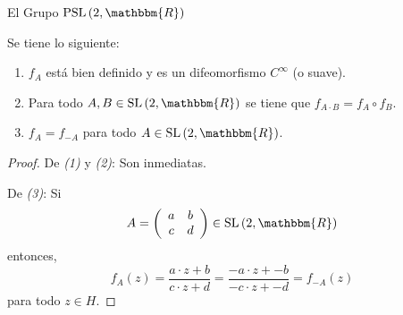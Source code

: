 \documentclass[xcolor=dvipsnames]{beamer}
\theoremstyle{largebreak}
\newcommand{\bbm}[1]{\ensuremath{\mathbbm{#1}}}
\newcommand{\SL}[1]{\ensuremath{\textup{SL}\left(#1\right)}}
\newcommand{\PSL}[1]{\ensuremath{\textup{PSL}\left(#1\right)}}
\begin{document}
\begin{frame}{El Grupo $\PSL{2,\bbm{R}}$}
    \begin{propo}
        Se tiene lo siguiente:
        \begin{enumerate}[label = \textit{(\arabic*)}]
            \item $f_A$ está bien definido y es un difeomorfismo $C^\infty$ (o suave).
            \item Para todo $A,B\in\SL{2,\bbm{R}}$ se tiene que $f_{A\cdot B}=f_A\circ f_B$.
            \item $f_A=f_{-A}$ para todo $A\in\SL{2,\bbm{R}}$.
        \end{enumerate}
    \end{propo}

    \begin{proof}
        De \textit{(1)} y \textit{(2)}: Son inmediatas.

        De \textit{(3)}: Si
        \begin{equation*}
            A=\left(
                \begin{array}{cc}
                    a & b \\
                    c & d \\
                \end{array}
             \right)\in\SL{2,\bbm{R}}
        \end{equation*}
        entonces,
        \begin{equation*}
            f_A(z)=\frac{a\cdot z+b}{c\cdot z+d}=\frac{-a\cdot z+-b}{-c\cdot z+-d}=f_{-A}(z)
        \end{equation*}
        para todo $z\in H$.
    \end{proof}

\end{frame}
\end{document}
